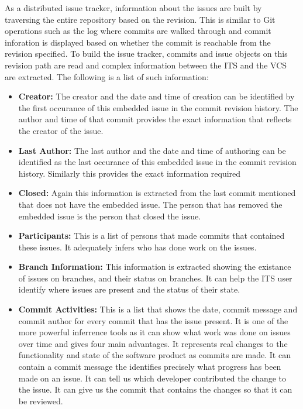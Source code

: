 \documentclass{mproj}
\begin{document}
As a distributed issue tracker, information about the issues are built by traversing the entire repository based on the revision. This is similar to Git operations such as the log where commits are walked through and commit inforation is displayed based on whether the commit is reachable from the revision specified. To build the issue tracker, commits and issue objects on this revision path are read and complex information between the ITS and the VCS are extracted. The following is a list of such information:

\begin{itemize}
    \item \textbf{Creator:} The creator and the date and time of creation can be identified by the first occurance of this embedded issue in the commit revision history. The author and time of that commit provides the exact information that reflects the creator of the issue.
    \item \textbf{Last Author:} The last author and the date and time of authoring can be identified as the last occurance of this embedded issue in the commit revision history. Similarly this provides the exact information required
    \item \textbf{Closed:} Again this information is extracted from the last commit mentioned that does not have the embedded issue. The person that has removed the embedded issue is the person that closed the issue.
    \item \textbf{Participants:} This is a list of persons that made commits that contained these issues. It adequately infers who has done work on the issues.
    \item \textbf{Branch Information:} This information is extracted showing the existance of issues on branches, and their status on branches. It can help the ITS user identify where issues are present and the status of their state.
    \item \textbf{Commit Activities:} This is a list that shows the date, commit message and commit author for every commit that has the issue present. It is one of the more powerful inferrence tools as it can show what work was done on issues over time and gives four main advantages. It represents real changes to the functionality and state of the software product as commits are made. It can contain a commit message the identifies precisely what progress has been made on an issue. It can tell us which developer contributed the change to the issue. It can give us the commit that contains the changes so that it can be reviewed.
\end{itemize}
\end{document}
